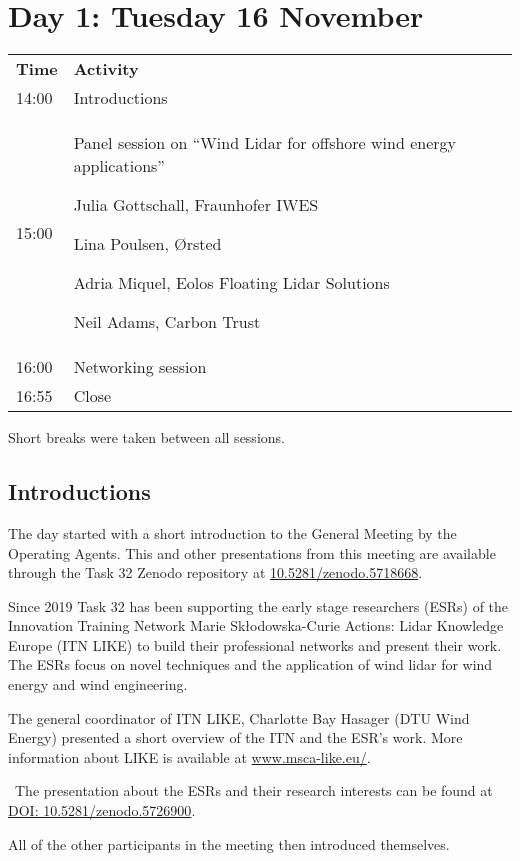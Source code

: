 \section{Day 1: Tuesday 16 November}

\bgroup
\begin{table}[!h]
 \centering
 \begin{tabular}{@{}|p{}|p{}|@{}}
 \rowcolor{Task32Blue2} \textbf{Time} & \textbf{Activity} \\
 14:00 & Introductions\\
 15:00 & Panel session on “Wind Lidar for offshore wind energy applications”\par
  \begin{tableitemize}
        \item Julia Gottschall, Fraunhofer IWES
        \item Lina Poulsen, \O rsted
        \item Adria Miquel, Eolos Floating Lidar Solutions
        \item Neil Adams, Carbon Trust
    \end{tableitemize} \\
 16:00 & Networking session\\
 16:55 & Close \\
 \end{tabular}
 \label{tab:day1-agenda}
\end{table}
\egroup

Short breaks were taken between all sessions.

\subsection{Introductions}
The day started with a short introduction to the General Meeting by the Operating Agents. This and other presentations from this meeting are available through the Task 32 Zenodo repository at \href{https://doi.org/10.5281/zenodo.5718668}{10.5281/zenodo.5718668}.

Since 2019 Task 32 has been supporting the early stage researchers (ESRs) of the Innovation Training Network Marie Skłodowska-Curie Actions: Lidar Knowledge Europe (ITN LIKE) to build their professional networks and present their work. The ESRs focus on novel techniques and the application of wind lidar for wind energy and wind engineering.

The general coordinator of ITN LIKE, Charlotte Bay Hasager (DTU Wind Energy) presented a short overview of the ITN and the ESR's work. More information about LIKE is available at \href{https://www.msca-like.eu/}{www.msca-like.eu/}. 

\faFilePowerpointO ~The presentation about the ESRs and their research interests can be found at \href{https://doi.org/10.5281/zenodo.5726900
}{DOI: 10.5281/zenodo.5726900}.

All of the other participants in the meeting then introduced themselves. 

\clearpage